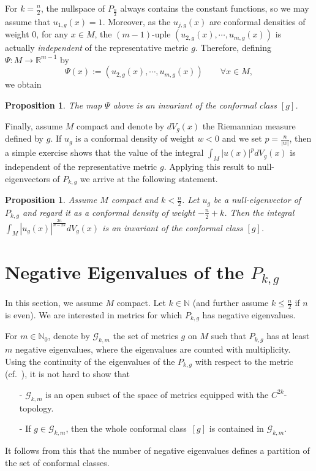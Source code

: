 \documentclass{amsart}
\newtheorem{proposition}[theorem]{Proposition}
\theoremstyle{definition}
\theoremstyle{remark}
\begin{document}
For $k=\frac{n}{2}$, the nullspace of $P_{\frac{n}{2}}$ always
contains the constant functions, so we may assume that
$u_{1,g}(x)=1$. Moreover, as the $u_{j,g}(x)$ are conformal densities
of weight $0$, for any $x \in M$, the $(m-1)$-uple
$(u_{2,g}(x),\cdots, u_{m,g}(x))$ is actually \emph{independent} of
the representative metric $g$.  Therefore, defining
$\Psi:M\rightarrow {{\mathbb{R}}}^{m-1}$ by
\begin{equation*}
   \Psi(x):= (u_{2,g}(x),\cdots ,u_{m,g}(x)) \qquad \forall x \in M,
\end{equation*}we obtain

\begin{proposition}
   The map $\Psi$ above is an invariant of the conformal class $[g]$.   
\end{proposition}

Finally, assume $M$ compact and denote by $dV_{g}(x)$ the Riemannian
measure defined by $g$. If $u_{g}$ is a conformal density of weight
$w<0$ and we set $p= \frac{n}{|w|}$, then a simple exercise shows that
the value of the integral $\int_{M}|u(x)|^{p}dV_{g}(x)$ is independent
of the representative metric $g$. Applying this result to
null-eigenvectors of $P_{k,g}$ we arrive at the following statement.

\begin{proposition}
Assume $M$ compact and $k<\frac{n}{2}$. Let $u_{g}$ be a null-eigenvector of $P_{k,g}$ and regard it as a conformal density of weight 
$-\frac{n}{2}+k$. Then the integral ${\displaystyle
  \int_{M}|u_{g}(x)|^{\frac{2n}{n-2k}}dV_{g}(x)}$ is an invariant of the
conformal class $[g]$.
\end{proposition}

\section{Negative Eigenvalues of the $P_{k,g}$} \label{sec:negative-eigv}
In this section, we assume $M$ compact. Let $k \in {\mathbb{N}}$ (and further assume 
$k\leq \frac{n}{2}$ if $n$ is even). We are 
interested in metrics for which $P_{k,g}$ has negative eigenvalues. 

For $m \in {\mathbb{N}}_{0}$, denote by ${{\mathcal{G}}}_{k,m}$ the set of metrics $g$ on
$M$ such that $P_{k,g}$ has at least $m$ negative eigenvalues, where
the eigenvalues are counted with multiplicity. Using the continuity of
the eigenvalues of the $P_{k,g}$ with respect to the metric
(cf.~\cite{Ca}), it is not hard to show that
\begin{itemize}
    \item[-] ${{\mathcal{G}}}_{k,m}$ is an open subset of the space of metrics
      equipped with the $C^{2k}$-topology.

    \item[-] If $g \in {{\mathcal{G}}}_{k,m}$, then the whole conformal
      class~$[g]$ is contained in ${{\mathcal{G}}}_{k,m}$.
\end{itemize}
It follows from this that the number of negative eigenvalues defines a
partition of the set of conformal classes. 
\end{document}
